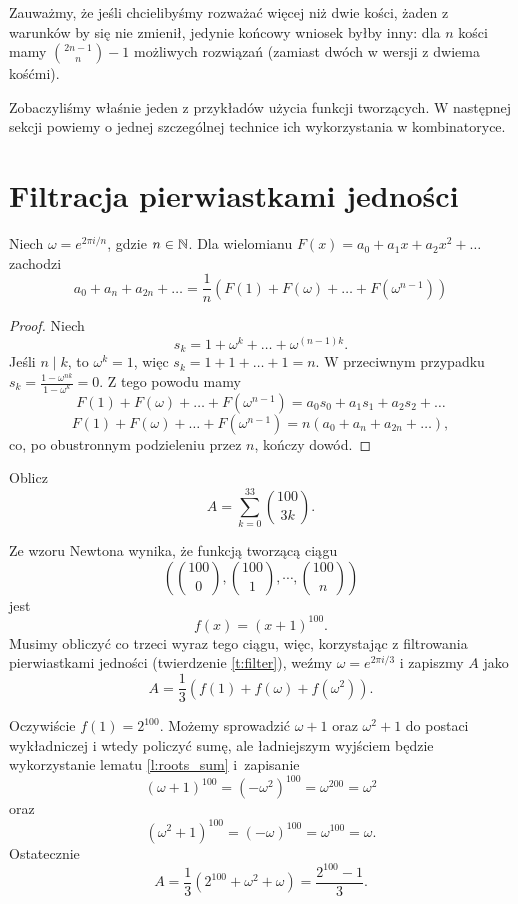 \documentclass{scrartcl}
\begin{document}
    Zauważmy, że jeśli chcielibyśmy rozważać więcej niż dwie kości, żaden z warunków by się nie zmienił, jedynie końcowy wniosek byłby inny: dla $n$ kości mamy $\binom{2n - 1}{n} - 1$ możliwych rozwiązań (zamiast dwóch w wersji z dwiema kośćmi).

    Zobaczyliśmy właśnie jeden z przykładów użycia funkcji tworzących. W następnej sekcji powiemy o jednej szczególnej technice ich wykorzystania w kombinatoryce.

\section{Filtracja pierwiastkami jedności}
    \begin{theorem}
        \label{t:filter}
        Niech $\omega = e^{2\pi i/n}$, gdzie $n \in \mathbb N$. Dla wielomianu $F(x) = a_0 + a_1x + a_2x^2 + \ldots$ zachodzi
        $$ a_0 + a_n + a_{2n} + \ldots = \frac{1}{n}\left(F(1) + F(\omega) + \ldots + F(\omega^{n - 1})\right) $$
    \end{theorem}
    \begin{proof}
        Niech
        $$ s_k = 1 + \omega^k + \ldots + \omega^{(n - 1)k}. $$
        Jeśli $n \mid k$, to $\omega^k = 1$, więc $s_k = 1 + 1 + \ldots + 1 = n$. W przeciwnym przypadku $s_k = \frac{1 - \omega^{nk}}{1 - \omega^k} = 0$.
        Z tego powodu mamy
        $$ F(1) + F(\omega) + \ldots + F(\omega^{n - 1}) = a_0s_0 + a_1s_1 + a_2s_2 + \ldots $$
        $$ F(1) + F(\omega) + \ldots + F(\omega^{n - 1}) = n(a_0 + a_n + a_{2n} + \ldots), $$
        co, po obustronnym podzieleniu przez $n$, kończy dowód.
    \end{proof}

    \begin{example}
        Oblicz $$ A = \sum_{k = 0}^{33} \binom{100}{3k}. $$
    \end{example}
    \begin{solution}
        Ze wzoru Newtona wynika, że funkcją tworzącą ciągu
        \[ \left(\textstyle{\binom{100}{0}, \binom{100}{1}, \cdots, \binom{100}{n}}\right) \]
        jest
        $$ f(x) = (x + 1)^{100}. $$
        Musimy obliczyć co trzeci wyraz tego ciągu, więc, korzystając z filtrowania pierwiastkami jedności (twierdzenie \ref{t:filter}), weźmy $\omega = e^{2\pi i /3}$ i zapiszmy $A$ jako
        $$ A = \frac{1}{3}\left(f(1) + f(\omega) + f(\omega^2)\right). $$

        Oczywiście $f(1) = 2^{100}$. Możemy sprowadzić $\omega + 1$ oraz $\omega^2 + 1$ do postaci wykładniczej i wtedy policzyć sumę, ale ładniejszym wyjściem będzie wykorzystanie lematu \ref{l:roots_sum} i~zapisanie
        $$ (\omega + 1)^{100} = (-\omega^2)^{100} = \omega^{200} = \omega^2 $$
        oraz
        $$ (\omega^2 + 1)^{100} = (-\omega)^{100} = \omega^{100} = \omega. $$
        Ostatecznie
        $$ A = \frac{1}{3}\left(2^{100} + \omega^2 + \omega\right) = \frac{2^{100} - 1}{3}. $$

    \end{solution}
\end{document}
